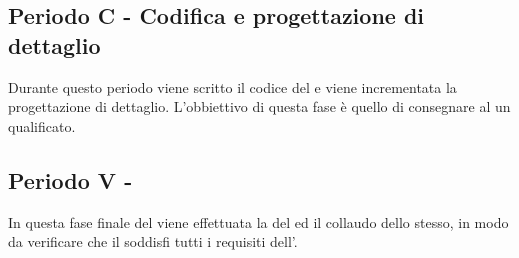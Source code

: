 \documentclass[./PianoDiProgetto.tex]{subfiles}
\begin{document}
  \subsection{Periodo C - Codifica e progettazione di dettaglio}

  Durante questo periodo viene scritto il codice del  e viene incrementata la progettazione di dettaglio. L'obbiettivo di questa fase è quello di consegnare al  un  qualificato.

  \subsection{Periodo V - }

  In questa fase finale del  viene effettuata la  del  ed il
  collaudo dello stesso, in modo da verificare che il  soddisfi tutti i requisiti
  dell'\ARdoc. 
\end{document}
